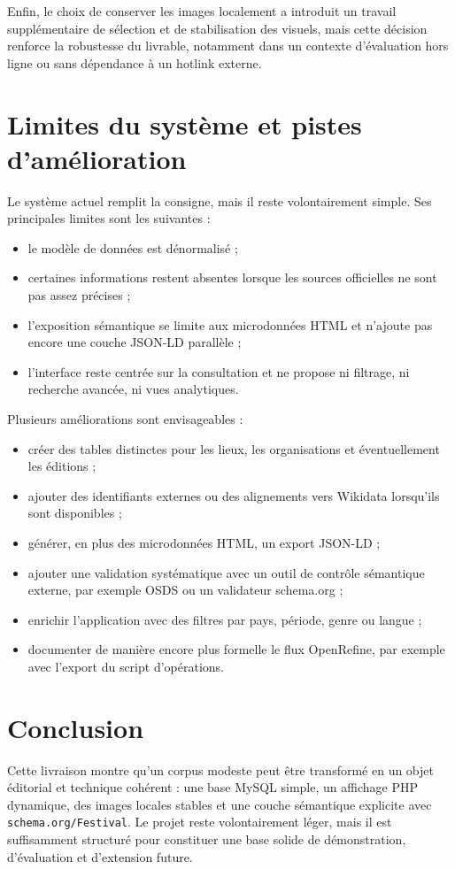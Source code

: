 \documentclass[11pt,a4paper]{article}
\begin{document}
Enfin, le choix de conserver les images localement a introduit un travail supplémentaire de sélection et de stabilisation des visuels, mais cette décision renforce la robustesse du livrable, notamment dans un contexte d'évaluation hors ligne ou sans dépendance à un hotlink externe.

\section{Limites du système et pistes d'amélioration}

Le système actuel remplit la consigne, mais il reste volontairement simple. Ses principales limites sont les suivantes :

\begin{itemize}
    \item le modèle de données est dénormalisé ;
    \item certaines informations restent absentes lorsque les sources officielles ne sont pas assez précises ;
    \item l'exposition sémantique se limite aux microdonnées HTML et n'ajoute pas encore une couche JSON-LD parallèle ;
    \item l'interface reste centrée sur la consultation et ne propose ni filtrage, ni recherche avancée, ni vues analytiques.
\end{itemize}

Plusieurs améliorations sont envisageables :

\begin{itemize}
    \item créer des tables distinctes pour les lieux, les organisations et éventuellement les éditions ;
    \item ajouter des identifiants externes ou des alignements vers Wikidata lorsqu'ils sont disponibles ;
    \item générer, en plus des microdonnées HTML, un export JSON-LD ;
    \item ajouter une validation systématique avec un outil de contrôle sémantique externe, par exemple OSDS ou un validateur schema.org ;
    \item enrichir l'application avec des filtres par pays, période, genre ou langue ;
    \item documenter de manière encore plus formelle le flux OpenRefine, par exemple avec l'export du script d'opérations.
\end{itemize}

\section*{Conclusion}

Cette livraison montre qu'un corpus modeste peut être transformé en un objet éditorial et technique cohérent : une base MySQL simple, un affichage PHP dynamique, des images locales stables et une couche sémantique explicite avec \texttt{schema.org/Festival}. Le projet reste volontairement léger, mais il est suffisamment structuré pour constituer une base solide de démonstration, d'évaluation et d'extension future.
\end{document}

